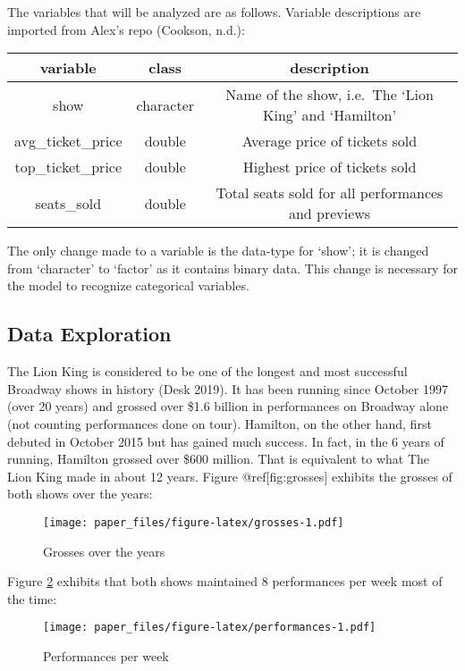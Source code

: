 \documentclass[
]{article}
\begin{document}
The variables that will be analyzed are as follows. Variable descriptions are imported from Alex's repo (Cookson, n.d.):

\begin{longtable}[]{@{}ccc@{}}
\toprule
variable & class & description\tabularnewline
\midrule
\endhead
show & character & Name of the show, i.e.~The `Lion King' and `Hamilton'\tabularnewline
avg\_ticket\_price & double & Average price of tickets sold\tabularnewline
top\_ticket\_price & double & Highest price of tickets sold\tabularnewline
seats\_sold & double & Total seats sold for all performances and previews\tabularnewline
\bottomrule
\end{longtable}

The only change made to a variable is the data-type for `show'; it is changed from `character' to `factor' as it contains binary data. This change is necessary for the model to recognize categorical variables.

\hypertarget{data-exploration}{%
\subsection{Data Exploration}\label{data-exploration}}

The Lion King is considered to be one of the longest and most successful Broadway shows in history (Desk 2019). It has been running since October 1997 (over 20 years) and grossed over \$1.6 billion in performances on Broadway alone (not counting performances done on tour). Hamilton, on the other hand, first debuted in October 2015 but has gained much success. In fact, in the 6 years of running, Hamilton grossed over \$600 million. That is equivalent to what The Lion King made in about 12 years. Figure @ref{[}fig:grosses{]} exhibits the grosses of both shows over the years:

\begin{figure}
\centering
\texttt{[image: paper\_files/figure-latex/grosses-1.pdf]}
\caption{\label{fig:grosses}Grosses over the years}
\end{figure}

\newpage

Figure \ref{fig:performances} exhibits that both shows maintained 8 performances per week most of the time:

\begin{figure}
\centering
\texttt{[image: paper\_files/figure-latex/performances-1.pdf]}
\caption{\label{fig:performances}Performances per week}
\end{figure}
\end{document}

